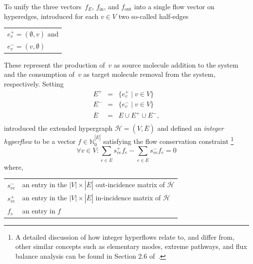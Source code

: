 To unify the three vectors~$f_E$, $f_{\text{in}}$, and $f_{\text{out}}$ into a single flow vector on hyperedges,
\cite{jakob_integer_hyperflows} introduced for each $v \in V$ two so-called half-edges

\begin{tabular}{l}
$e_v^+ = (\emptyset, v)$ and \\
$e_v^- = (v, \emptyset)$ \\
\end{tabular}

\noindent These represent the production of~$v$ as source molecule addition to the system and the consumption of~$v$ as target molecule removal from the system, respectively.
Setting
$$
\begin{array}{lcl}
E^+ & = & \{ e_v^+ \mid  v \in V\}\\
E^- & = & \{ e_v^- \mid  v \in V\}\\
\overline{E} & = & E \cup E^+ \cup E^-,\\
\end{array}
$$
\cite{jakob_integer_hyperflows} introduced the extended hypergraph $\overline{\mathcal{H}} = (V, \overline{E})$
and defined an \emph{integer hyperflow} to be a vector $f \in \mathbb{N}_{0}^{|\overline{E}|}$ satisfying the flow conservation constraint
\footnote{A detailed discussion of how integer hyperflows relate to, and differ from, other similar concepts such as elementary modes, extreme pathways, and flux balance analysis can be found in Section 2.6 of~\cite{jakob_integer_hyperflows}.}
\begin{equation}
    \forall v\in V\colon \sum_{ e\in \overline{E} } s_{ve}^+ f_e - \sum_{ e\in \overline{E} } s_{ve}^- f_e = 0 
    \label{int_hyperflow_jakob}
\end{equation}
where,

\begin{tabular}{ll}
$s_{ve}^-$ & an entry in the $|V|\times |\overline{E}|$ out-incidence matrix of $\overline{\mathcal{H}}$ \\
$s_{ve}^+$ & an entry in the $|V|\times |\overline{E}|$ in-incidence matrix of $\overline{\mathcal{H}}$ \\
$f_e$ & an entry in $f$ \\
\end{tabular}

